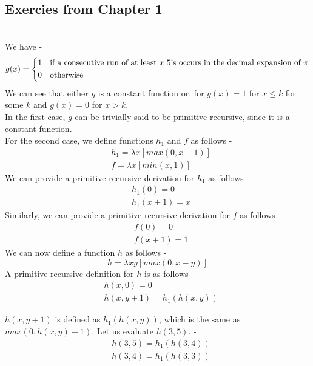 \documentclass[openany]{book}
\begin{document}
\subsection{Exercies from Chapter 1}
\begin{exercise} \\
    We have - 
    $$g(x) = \begin{dcases}
        1 & \text{if a consecutive run of at least $x$ 5's occurs in the decimal expansion of $\pi$} \\
        0 & \text{otherwise}
        \end{dcases}$$
    We can see that either $g$ is a constant function or, for $g(x) = 1$ for $x \leq k$ for some $k$ and $g(x)=0$ for $x > k$. \\
    In the first case, $g$ can be trivially said to be primitive recursive, since it is a constant function. \\
    For the second case, we define functions $h_1$ and $f$ as follows - 
    \begin{align*}
        &h_1 = \lambda x[max(0, x-1)] \\
        &f = \lambda x[min(x, 1)]
    \end{align*}
    We can provide a primitive recursive derivation for $h_1$ as follows - 
    \begin{align*}
        &h_1(0) = 0 \\
        &h_1(x+1) = x
    \end{align*}
    Similarly, we can provide a primitive recursive derivation for $f$ as follows - 
    \begin{align*}
        &f(0) = 0 \\
        &f(x+1) = 1
    \end{align*}
    We can now define a function $h$ as follows -
    $$h = \lambda xy[max(0, x-y)]$$
    A primitive recursive definition for $h$ is as follows -
    \begin{align*}
        &h(x, 0) = 0 \\
        &h(x, y+1) = h_1(h(x, y))
    \end{align*}
    \begin{mynote}
        $h(x, y+1)$ is defined as $h_1(h(x, y))$, which is the same as $max(0, h(x, y) - 1)$. Let us evaluate $h(3, 5)$. - \\
        \begin{align*}
            &h(3, 5) = h_1(h(3, 4)) \\
            &h(3, 4) = h_1(h(3, 3)) \\

\end{align*}
\end{mynote}
\end{exercise}
\end{document}
